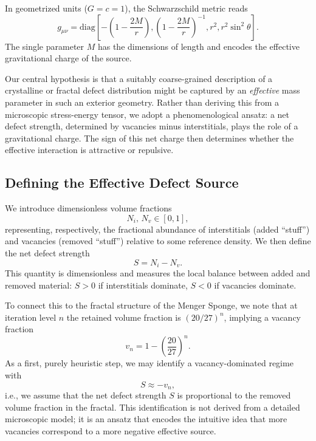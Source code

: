 \documentclass[%
  reprint,
  superscriptaddress,
  showpacs,
  showkeys,
  amsmath,amssymb,
  pra,
  longbibliography,
  floatfix,
  x11names
]{revtex4-2}
\begin{document}
In geometrized units (\(G=c=1\)), the Schwarzschild metric reads
\begin{equation}
g_{\mu\nu} = \text{diag}\left[-\left(1 - \frac{2M}{r}\right), \left(1 - \frac{2M}{r}\right)^{-1}, r^2, r^2 \sin^2 \theta\right].
\label{eq:schwarzschild}
\end{equation}
The single parameter \(M\) has the dimensions of length and encodes the effective gravitational charge of the source.

Our central hypothesis is that a suitably coarse-grained description of a crystalline or fractal defect distribution might be captured by an \emph{effective} mass parameter in such an exterior geometry. Rather than deriving this from a microscopic stress-energy tensor, we adopt a phenomenological ansatz: a net defect strength, determined by vacancies minus interstitials, plays the role of a gravitational charge. The sign of this net charge then determines whether the effective interaction is attractive or repulsive.

\subsection{Defining the Effective Defect Source}
\label{sec:defect-source}

We introduce dimensionless volume fractions
\begin{equation}
N_i,\,N_v \in [0,1],
\end{equation}
representing, respectively, the fractional abundance of interstitials (added ``stuff'') and vacancies (removed ``stuff'') relative to some reference density. We then define the net defect strength
\begin{equation}
S = N_i - N_v.
\end{equation}
This quantity is dimensionless and measures the local balance between added and removed material: \(S>0\) if interstitials dominate, \(S<0\) if vacancies dominate.

To connect this to the fractal structure of the Menger Sponge, we note that at iteration level \(n\) the retained volume fraction is \((20/27)^n\), implying a vacancy fraction
\begin{equation}
v_n = 1 - \left(\frac{20}{27}\right)^n.
\end{equation}
As a first, purely heuristic step, we may identify a vacancy-dominated regime with
\begin{equation}
S \approx -v_n,
\end{equation}
i.e., we assume that the net defect strength \(S\) is proportional to the removed volume fraction in the fractal. This identification is not derived from a detailed microscopic model; it is an ansatz that encodes the intuitive idea that more vacancies correspond to a more negative effective source.
\end{document}
